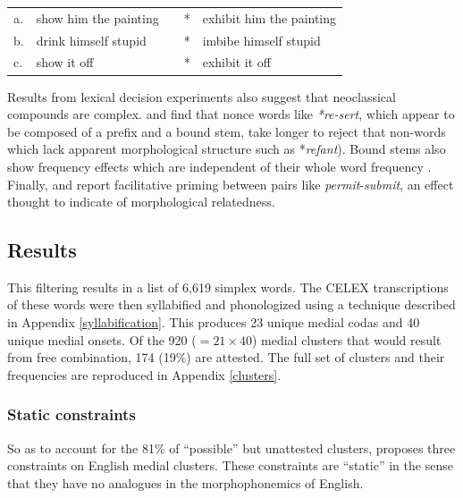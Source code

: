 \begin{example} 
\label{harley}
\begin{tabular}{l l l l@{} l}
a. & {show him the painting} & \alt{} & * & {exhibit him the painting} \\
b. & {drink himself stupid}  & \alt{} & * & {imbibe himself stupid}    \\
c. & {show it off}           & \alt{} & * & {exhibit it off}           \\
\end{tabular}
\end{example}

Results from lexical decision experiments also suggest that neoclassical compounds are complex. \citet{Taft1975,Taft1976} and \citet{Taft1986} find that nonce words like \emph{*re-sert}, which appear to be composed of a prefix and a bound stem, take longer to reject that non-words which lack apparent morphological structure such as *\emph{refant}). Bound stems also show frequency effects which are independent of their whole word frequency \citep{Taft1979,Taft2006}. Finally, \citet{Emmorey1989} and \citet{Forster2000} report facilitative priming between pairs like \emph{permit}-\emph{submit}, an effect thought to indicate of morphological relatedness.

\subsection{Results}

This filtering results in a list of 6,619 simplex words. The CELEX transcriptions of these words were then syllabified and phonologized using a technique described in Appendix \ref{syllabification}. This produces 23 unique medial codas and 40 unique medial onsets. Of the 920 ($= 21 \times 40$) medial clusters that would result from free combination, 174 (19\%) are attested. The full set of clusters and their frequencies are reproduced in Appendix \ref{clusters}. 

\subsubsection{Static constraints}

So as to account for the 81\% of ``possible'' but unattested clusters, \citet{Pierrehumbert1994} proposes three constraints on English medial clusters. These constraints are ``static'' in the sense that they have no analogues in the morphophonemics of English. 

